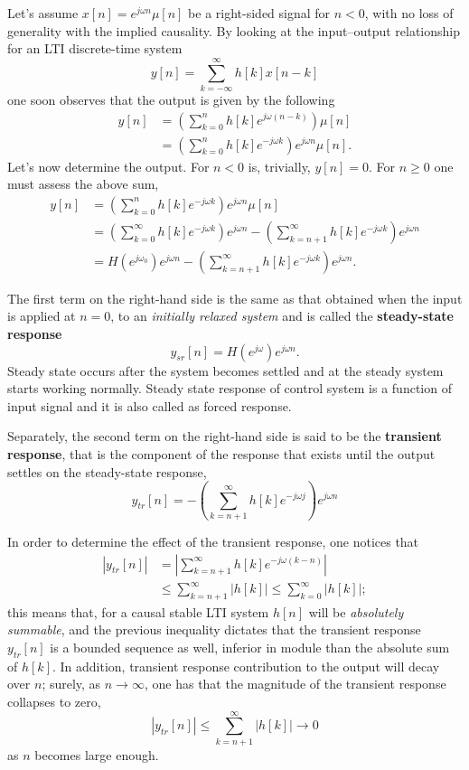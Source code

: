 \documentclass[\documentfontsize, twocolumn]{\classname}
\begin{document}
Let's assume $x[n] = e^{j\omega n}\mu[n]$ be a right-sided signal for $n < 0$, with no loss of generality with the implied causality. By looking at the input--output relationship for an LTI discrete-time system
\[
    y[n] = \sum_{k=-\infty}^\infty h[k]x[n-k]
\]
one soon observes that the output is given by the following
\begin{align*}
    y[n] &= \left(\sum_{k=0}^n h[k] e^{j\omega(n - k)}\right) \mu[n]\\
         &=\left(\sum_{k=0}^n h[k] e^{-j\omega k}\right)e^{j\omega n} \mu[n].
\end{align*}
Let's now determine the output. For $n<0$ is, trivially, $y[n]=0$. For $n \geq 0$ one must assess the above sum,
\begin{align*}
    y[n] &= \left(\sum_{k=0}^n h[k] e^{-j\omega k}\right)e^{j\omega n} \mu[n]\\
    &= \left(\sum_{k=0}^\infty h[k] e^{-j\omega k}\right)e^{j\omega n} - \left(\sum_{k=n+1}^\infty h[k] e^{-j\omega k}\right)e^{j\omega n} \\
    &= H(e^{j\omega_0})e^{j\omega n} - \left(\sum_{k=n+1}^\infty h[k] e^{-j\omega k}\right)e^{j\omega n}.
\end{align*}

The first term on the right-hand side is the same as that obtained when the input is applied at $n=0$, to an \emph{initially relaxed system} and is called the \textbf{steady-state response}
\begin{equation}\label{eqn:steadyStateResponse}
    y_{sr}[n] = H(e^{j\omega})e^{j\omega n}.
\end{equation}
Steady state occurs after the system becomes settled and at the steady system starts working normally. Steady state response of control system is a function of input signal and it is also called as forced response.

Separately, the second term on the right-hand side is said to be the \textbf{transient response}, that is the component of the response that exists until the output settles on the steady-state response,
\begin{equation}\label{eqn:transientResponse}
    y_{tr}[n] = -\left(\sum_{k=n+1}^\infty h[k] e^{-j\omega j}\right) e^{j\omega n}
\end{equation}

In order to determine the effect of the transient response, one notices that
\begin{align*}
    |y_{tr}[n]| &= \left|\sum_{k=n+1}^\infty h[k] e^{-j\omega(k-n)}\right| \\
                &\leq \sum_{k=n+1}^\infty |h[k]| \leq \sum_{k=0}^\infty |h[k]|;
\end{align*}
this means that, for a causal stable LTI system $h[n]$ will be \emph{absolutely summable}, and the previous inequality dictates that the transient response $y_{tr}[n]$ is a bounded sequence as well, inferior in module than the absolute sum of $h[k]$. In addition, transient response contribution to the output will decay over $n$; surely, as $n \rightarrow \infty$, one has that the magnitude of the transient response collapses to zero,
\[
    |y_{tr}[n]| \leq \sum_{k=n+1}^\infty |h[k]| \rightarrow 0
\]
as $n$ becomes large enough.
\end{document}
